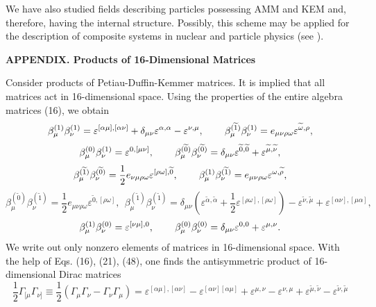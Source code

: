 \documentclass[a4paper,12pt]{article}
\begin{document}
We have also studied fields describing particles possessing AMM
and KEM and, therefore, having the internal structure. Possibly,
this scheme may be applied for the description of composite
systems in nuclear and particle physics (see \cite{Kirchbach}).

\vspace{5mm} {\bf APPENDIX. Products of 16-Dimensional Matrices}
\vspace{5mm}

Consider products of Petiau-Duffin-Kemmer matrices. It is implied
that all matrices act in 16-dimensional space. Using the
properties of the entire algebra matrices (16), we obtain
\[
\beta _\mu ^{(1)}\beta _\nu ^{(1)}=\varepsilon ^{[\alpha\mu]
,[\alpha \nu]} + \delta_{\mu\nu}\varepsilon^{\alpha,\alpha}
-\varepsilon ^{\nu ,\mu } ,\hspace{0.3in} \beta _\mu
^{(\widetilde{1})}\beta _\nu ^{(1)}=e_{\mu \nu \rho \omega
}\varepsilon ^{\widetilde{\omega },\rho} ,
\]
\[
\beta _\mu ^{(0)}\beta _\nu ^{(1)}=\varepsilon ^{0,[\mu\nu]}
,\hspace{0.3in}\beta _\mu ^{(\widetilde{0})}\beta _\nu
^{(\widetilde{0})}=\delta_{\mu\nu}\varepsilon^{\widetilde{0},\widetilde{0}}
+\varepsilon ^{\widetilde{\mu },\widetilde{\nu }} ,
\]
\begin{equation}
\beta _\mu ^{(\widetilde{1})}\beta _\nu
^{(\widetilde{0})}=\frac{1}{2}e_{\nu\mu \rho \omega }\varepsilon
^{ [\rho\omega],\widetilde{0}} ,\hspace{0.3in}\beta _\mu
^{(1)}\beta _\nu ^{(\widetilde{1})}=e_{\mu\nu\rho \omega
}\varepsilon ^{\omega,\widetilde{\rho}} ,\label{96}
\end{equation}
\[
\beta _\mu ^{(\widetilde{0})}\beta _\nu
^{(\widetilde{1})}=\frac{1}{2}e_{ \mu\nu \rho \omega }\varepsilon
^{\widetilde{0},[\rho\omega]} ,~~\beta _\mu
^{(\widetilde{1})}\beta _\nu ^{(\widetilde{1})}= \delta_{\mu\nu}
\left(\varepsilon^{\widetilde{\alpha},\widetilde{\alpha}} +
\frac{1}{2}\varepsilon ^{[\rho\omega],[\rho\omega]} \right)-
\varepsilon^{\widetilde{\nu},\widetilde{\mu}} + \varepsilon
^{[\alpha\nu],[\mu\alpha]} ,
\]
\[
\beta _\mu ^{(1)}\beta _\nu ^{(0)}=\varepsilon ^{[\nu\mu] ,0}
,\hspace{0.3in}\beta _\mu ^{(0)}\beta _\nu ^{(0)}=\delta_{\mu\nu}
\varepsilon^{0,0} + \varepsilon ^{\mu,\nu} .
\]
We write out only nonzero elements of matrices in 16-dimensional
space. With the help of Eqs. (16), (21), (48), one finds the
antisymmetric product of 16-dimensional Dirac matrices
\[
\frac{1}{2}\Gamma_{[\mu} \Gamma _{\nu
]}\equiv\frac{1}{2}\left(\Gamma_\mu \Gamma _\nu -\Gamma_\nu \Gamma
_\mu \right)=\varepsilon ^{[\alpha\mu],[\alpha\nu]}- \varepsilon
^{[\alpha\nu][ \alpha\mu]} +\varepsilon ^{\mu,\nu}-\varepsilon
^{\nu,\mu} + \varepsilon^{\widetilde{\mu},\widetilde{\nu}} -
\varepsilon^{\widetilde{\nu},\widetilde{\mu}}
\]
\end{document}
